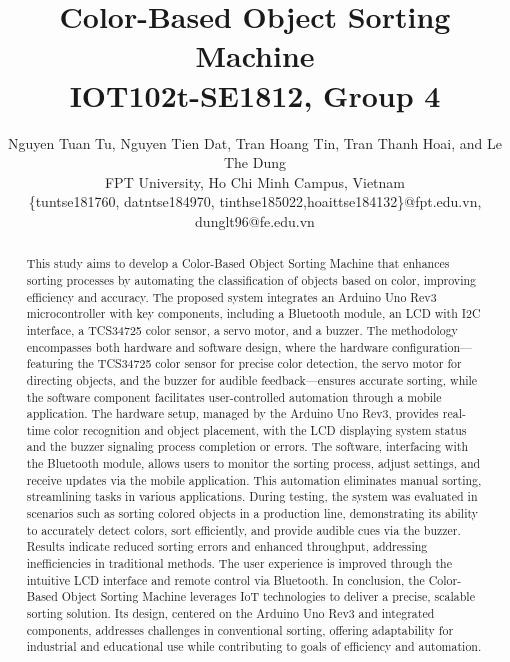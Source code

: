 \documentclass[conference, onecolumn]{IEEEtran}
\begin{document}
\title{Color-Based Object Sorting Machine\\
{\large IOT102t-SE1812, Group 4}}

\author{
Nguyen Tuan Tu, Nguyen Tien Dat, Tran Hoang Tin, Tran Thanh Hoai, and Le The Dung\\
FPT University, Ho Chi Minh Campus, Vietnam\\
\{tuntse181760,
datntse184970,
tinthse185022,hoaittse184132\}@fpt.edu.vn,
\\ dunglt96@fe.edu.vn}
\maketitle

\begin{abstract}
This study aims to develop a Color-Based Object Sorting Machine that enhances sorting processes by automating the classification of objects based on color, improving efficiency and accuracy. The proposed system integrates an Arduino Uno Rev3 microcontroller with key components, including a Bluetooth module, an LCD with I2C interface, a TCS34725 color sensor, a servo motor, and a buzzer. The methodology encompasses both hardware and software design, where the hardware configuration—featuring the TCS34725 color sensor for precise color detection, the servo motor for directing objects, and the buzzer for audible feedback—ensures accurate sorting, while the software component facilitates user-controlled automation through a mobile application. The hardware setup, managed by the Arduino Uno Rev3, provides real-time color recognition and object placement, with the LCD displaying system status and the buzzer signaling process completion or errors. The software, interfacing with the Bluetooth module, allows users to monitor the sorting process, adjust settings, and receive updates via the mobile application. This automation eliminates manual sorting, streamlining tasks in various applications. During testing, the system was evaluated in scenarios such as sorting colored objects in a production line, demonstrating its ability to accurately detect colors, sort efficiently, and provide audible cues via the buzzer. Results indicate reduced sorting errors and enhanced throughput, addressing inefficiencies in traditional methods. The user experience is improved through the intuitive LCD interface and remote control via Bluetooth. In conclusion, the Color-Based Object Sorting Machine leverages IoT technologies to deliver a precise, scalable sorting solution. Its design, centered on the Arduino Uno Rev3 and integrated components, addresses challenges in conventional sorting, offering adaptability for industrial and educational use while contributing to goals of efficiency and automation.
\end{abstract}
\end{document}
